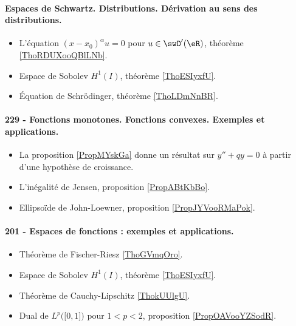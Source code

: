 \paragraph{Espaces de Schwartz. Distributions. Dérivation au sens des distributions.}
\begin{itemize}
    \item L'équation \( (x-x_0)^{\alpha}u=0\) pour \( u\in\swD'(\eR)\), théorème \ref{ThoRDUXooQBlLNb}.
    \item Espace de Sobolev \( H^1(I)\), théorème \ref{ThoESIyxfU}.
    \item Équation de Schrödinger, théorème \ref{ThoLDmNnBR}.
\end{itemize}

\paragraph{229 - Fonctions monotones. Fonctions convexes. Exemples et applications.}
\begin{itemize}
    \item La proposition \ref{PropMYskGa} donne un résultat sur \( y''+qy=0\) à partir d'une hypothèse de croissance.
    \item L'inégalité de Jensen, proposition \ref{PropABtKbBo}.
    \item Ellipsoïde de John-Loewner, proposition \ref{PropJYVooRMaPok}.
\end{itemize}
\paragraph{201 - Espaces de fonctions : exemples et applications.}
\begin{itemize}
    \item Théorème de Fischer-Riesz \ref{ThoGVmqOro}.
    \item Espace de Sobolev \( H^1(I)\), théorème \ref{ThoESIyxfU}.
    \item Théorème de Cauchy-Lipschitz \ref{ThokUUlgU}.
    \item Dual de \( L^p\big( \mathopen[ 0 , 1 \mathclose] \big)\) pour \( 1<p<2\), proposition \ref{PropOAVooYZSodR}.
\end{itemize}
